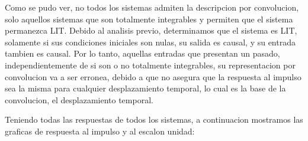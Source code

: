 \documentclass[12pt,a4paper]{report}
\begin{document}
\begin{enumerate}[label=\alph*)]
\begin{table}[h!]
\begin{tabular}{|c|c|c|c|}
        \end{tabular}
      \end{table}

      Como se pudo ver, no todos los sistemas admiten la descripcion por convolucion, solo aquellos sistemas que son
      totalmente integrables y permiten que el sistema permanezca LIT. Debido al analisis previo, determinamos que el
      sistema es LIT, solamente si sus condiciones iniciales son nulas, su salida es causal, y su entrada tambien es
      causal. Por lo tanto, aquellas entradas que presentan un pasado, independientemente de si son o no totalmente
      integrables, su representacion por convolucion va a ser erronea, debido a que no asegura que la respuesta al
      impulso sea la misma para cualquier desplazamiento temporal, lo cual es la base de la convolucion, el desplazamiento
      temporal.

      Teniendo todas las respuestas de todos los sistemas, a continuacion mostramos las graficas de respuesta al
      impulso y al escalon unidad:


\end{enumerate}
\end{document}
